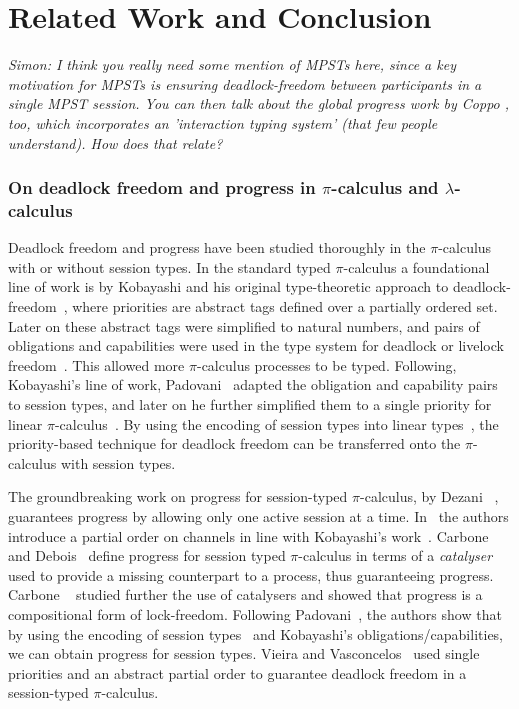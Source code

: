 \documentclass[main.tex]{subfiles}
\begin{document}
\section{Related Work and Conclusion}
\textit{Simon: I think you really need some mention of MPSTs here, since a key motivation for MPSTs is ensuring deadlock-freedom between participants in a single MPST session. You can then talk about the global progress work by Coppo \etal, too, which incorporates an 'interaction typing system' (that few people understand). How does that relate?}

\subsubsection*{On deadlock freedom and progress in $\pi$-calculus and $\lambda$-calculus}
Deadlock freedom and progress have been studied thoroughly in the $\pi$-calculus with or without session types.
In the standard typed $\pi$-calculus a foundational line of work is by Kobayashi and his original type-theoretic approach to deadlock-freedom~\cite{kobayashi98}, where priorities are abstract tags defined over a partially ordered set. Later on these abstract tags were simplified to natural numbers, and pairs of obligations and capabilities were used in the type system for deadlock or livelock freedom~\cite{kobayashi02,kobayashi06}. This allowed more $\pi$-calculus processes to be typed. Following, Kobayashi's line of work, Padovani~\cite{padovani13} adapted the obligation and capability pairs to session types, and later on he further simplified them to a single priority for linear $\pi$-calculus~\cite{padovani14}. By using the encoding of session types into linear types~\cite{kobayashi07,dardhagiachino12,dardha14beat,dardha16}, the priority-based technique for deadlock freedom can be transferred onto the $\pi$-calculus with session types.

The groundbreaking work on progress for session-typed $\pi$-calculus, by Dezani \etal~\cite{dezani-ciancaglinimostrous06}, guarantees progress by allowing only one active session at a time. In~\cite{dezani-ciancagliniliguoro09progress} the authors introduce a partial order on channels in line with Kobayashi's work~\cite{kobayashi98}. Carbone and Debois~\cite{carbonedebois10} define progress for session typed $\pi$-calculus in terms of a \emph{catalyser} used to provide a missing counterpart to a process, thus guaranteeing progress.
Carbone \etal~\cite{carbonedardha14} studied further the use of catalysers and showed that progress is a compositional form of lock-freedom. Following Padovani~\cite{padovani14}, the authors show that by using the encoding of session types~\cite{dardhagiachino12} and Kobayashi's obligations/capabilities, we can obtain progress for session types. Vieira and Vasconcelos~\cite{vieiravasconcelos13} used single priorities and an abstract partial order to guarantee deadlock freedom in a session-typed $\pi$-calculus.
\end{document}
